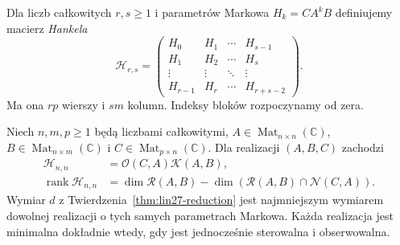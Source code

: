 \begin{definicja}
\label{def:lin27-hankel}
Dla liczb całkowitych
\(r,s\ge1\)
i parametrów Markowa
\(H_k=CA^kB\)
definiujemy macierz
\emph{Hankela}
\[
 \mathcal H_{r,s}=
 \begin{pmatrix}
 H_0&H_1&\cdots&H_{s-1}\\
 H_1&H_2&\cdots&H_s\\
 \vdots&\vdots&\ddots&\vdots\\
 H_{r-1}&H_r&\cdots&H_{r+s-2}
 \end{pmatrix}.
\]
Ma ona \(rp\) wierszy
i \(sm\) kolumn.
Indeksy bloków rozpoczynamy
od zera.
\end{definicja}

\begin{twierdzenie}
\label{thm:lin27-hankel-rank}
Niech \(n,m,p\ge1\) będą liczbami całkowitymi,
\(A\in\operatorname{Mat}_{n\times n}(\mathbb C)\),
\(B\in\operatorname{Mat}_{n\times m}(\mathbb C)\)
i \(C\in\operatorname{Mat}_{p\times n}(\mathbb C)\).
Dla realizacji \((A,B,C)\) zachodzi
\[
 \begin{aligned}
 \mathcal H_{n,n}
 &=\mathcal O(C,A)\mathcal K(A,B),\\
 \operatorname{rank}\mathcal H_{n,n}
 &=\dim\mathcal R(A,B)
    -\dim(\mathcal R(A,B)\cap
               \mathcal N(C,A)).
 \end{aligned}
\]
Wymiar \(d\) z
Twierdzenia~\ref{thm:lin27-reduction}
jest najmniejszym
wymiarem dowolnej
realizacji o tych samych
parametrach Markowa.
Każda realizacja
jest minimalna
dokładnie wtedy,
gdy jest jednocześnie
sterowalna i obserwowalna.
\end{twierdzenie}
